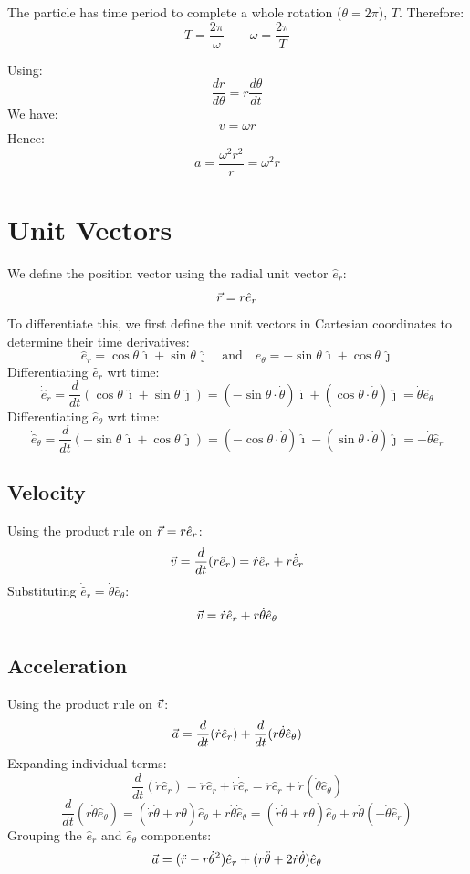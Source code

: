 The particle has time period to complete a whole rotation ($\theta = 2 \pi$), $T$. Therefore:
\[
    T = \frac{2 \pi}{\omega} \qquad \omega = \frac{2 \pi}{T}
\]

Using:
\[
    \frac{dr}{d \theta} = r \frac{d \theta}{dt}
\]
We have:
\[
    v = \omega r
\]
Hence:
\[
    a = \frac{\omega^2 r^2}{r} = \omega^2 r
\]

\section{Unit Vectors}
We define the position vector using the radial unit vector $\hat{e}_r$:
\[
    \vec{r} = r \hat{e}_r
\]
To differentiate this, we first define the unit vectors in Cartesian coordinates to determine their time derivatives:
\[
    \hat{e}_r = \cos\theta \, \hat{\imath} + \sin\theta \, \hat{\jmath} \quad \text{and} \quad \hat{e}_\theta = -\sin\theta \, \hat{\imath} + \cos\theta \, \hat{\jmath}
\]
Differentiating $\hat{e}_r$ wrt time:
\[
    \dot{\hat{e}}_r = \frac{d}{dt}(\cos\theta \, \hat{\imath} + \sin\theta \, \hat{\jmath}) = (-\sin\theta \cdot \dot{\theta}) \hat{\imath} + (\cos\theta \cdot \dot{\theta}) \hat{\jmath} = \dot{\theta} \hat{e}_\theta
\]
Differentiating $\hat{e}_\theta$ wrt time:
\[
    \dot{\hat{e}}_\theta = \frac{d}{dt}(-\sin\theta \, \hat{\imath} + \cos\theta \, \hat{\jmath}) = (-\cos\theta \cdot \dot{\theta}) \hat{\imath} - (\sin\theta \cdot \dot{\theta}) \hat{\jmath} = -\dot{\theta} \hat{e}_r
\]

\subsection{Velocity}
Using the product rule on $\vec{r} = r \hat{e}_r$:
\[
    \vec{v} = \frac{d}{dt}(r \hat{e}_r) = \dot{r} \hat{e}_r + r \dot{\hat{e}}_r
\]
Substituting $\dot{\hat{e}}_r = \dot{\theta} \hat{e}_\theta$:
\[
    \vec{v} = \dot{r} \hat{e}_r + r \dot{\theta} \hat{e}_\theta
\]

\subsection{Acceleration}
Using the product rule on $\vec{v}$:
\[
    \vec{a} = \frac{d}{dt}(\dot{r} \hat{e}_r) + \frac{d}{dt}(r \dot{\theta} \hat{e}_\theta)
\]
Expanding individual terms:
\[
    \frac{d}{dt}(\dot{r} \hat{e}_r) = \ddot{r} \hat{e}_r + \dot{r} \dot{\hat{e}}_r = \ddot{r} \hat{e}_r + \dot{r} (\dot{\theta} \hat{e}_\theta)
\]
\[
    \frac{d}{dt}(r \dot{\theta} \hat{e}_\theta) = (\dot{r} \dot{\theta} + r \ddot{\theta}) \hat{e}_\theta + r \dot{\theta} \dot{\hat{e}}_\theta = (\dot{r} \dot{\theta} + r \ddot{\theta}) \hat{e}_\theta + r \dot{\theta} (-\dot{\theta} \hat{e}_r)
\]
Grouping the $\hat{e}_r$ and $\hat{e}_\theta$ components:
\[
    \vec{a} = (\ddot{r} - r \dot{\theta}^2) \hat{e}_r + (r \ddot{\theta} + 2 \dot{r} \dot{\theta}) \hat{e}_\theta
\]

